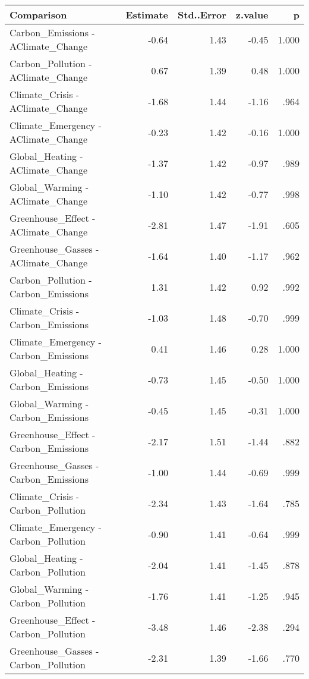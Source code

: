 \begin{table}[ht]
\centering
\begin{tabular}{lrrrr}
  \hline
Comparison & Estimate & Std..Error & z.value & p \\ 
  \hline
Carbon\_Emissions - AClimate\_Change & -0.64 & 1.43 & -0.45 & 1.000 \\ 
  Carbon\_Pollution - AClimate\_Change & 0.67 & 1.39 & 0.48 & 1.000 \\ 
  Climate\_Crisis - AClimate\_Change & -1.68 & 1.44 & -1.16 & .964 \\ 
  Climate\_Emergency - AClimate\_Change & -0.23 & 1.42 & -0.16 & 1.000 \\ 
  Global\_Heating - AClimate\_Change & -1.37 & 1.42 & -0.97 & .989 \\ 
  Global\_Warming - AClimate\_Change & -1.10 & 1.42 & -0.77 & .998 \\ 
  Greenhouse\_Effect - AClimate\_Change & -2.81 & 1.47 & -1.91 & .605 \\ 
  Greenhouse\_Gasses - AClimate\_Change & -1.64 & 1.40 & -1.17 & .962 \\ 
  Carbon\_Pollution - Carbon\_Emissions & 1.31 & 1.42 & 0.92 & .992 \\ 
  Climate\_Crisis - Carbon\_Emissions & -1.03 & 1.48 & -0.70 & .999 \\ 
  Climate\_Emergency - Carbon\_Emissions & 0.41 & 1.46 & 0.28 & 1.000 \\ 
  Global\_Heating - Carbon\_Emissions & -0.73 & 1.45 & -0.50 & 1.000 \\ 
  Global\_Warming - Carbon\_Emissions & -0.45 & 1.45 & -0.31 & 1.000 \\ 
  Greenhouse\_Effect - Carbon\_Emissions & -2.17 & 1.51 & -1.44 & .882 \\ 
  Greenhouse\_Gasses - Carbon\_Emissions & -1.00 & 1.44 & -0.69 & .999 \\ 
  Climate\_Crisis - Carbon\_Pollution & -2.34 & 1.43 & -1.64 & .785 \\ 
  Climate\_Emergency - Carbon\_Pollution & -0.90 & 1.41 & -0.64 & .999 \\ 
  Global\_Heating - Carbon\_Pollution & -2.04 & 1.41 & -1.45 & .878 \\ 
  Global\_Warming - Carbon\_Pollution & -1.76 & 1.41 & -1.25 & .945 \\ 
  Greenhouse\_Effect - Carbon\_Pollution & -3.48 & 1.46 & -2.38 & .294 \\ 
  Greenhouse\_Gasses - Carbon\_Pollution & -2.31 & 1.39 & -1.66 & .770 \\ 

\end{tabular}
\end{table}
